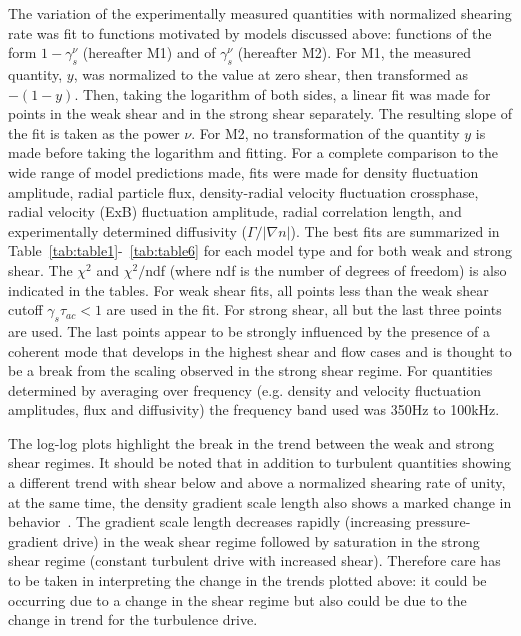 \documentclass[aip,pop,amsmath,amssymb,peprint,superscriptaddress]{revtex4-1} %
\begin{document}
The variation of the experimentally measured quantities with normalized shearing rate was fit to functions motivated by models discussed above: functions of the form $1-\gamma_{s}^{\nu}$ (hereafter M1) and of $\gamma_{s}^{\nu}$ (hereafter M2). For M1, the measured quantity, $y$, was normalized to the value at zero shear, then transformed as $-(1-y)$. Then, taking the logarithm of both sides, a linear fit was made for points in the weak shear and in the strong shear separately. The resulting slope of the fit is taken as the power $\nu$. For M2, no transformation of the quantity $y$ is made before taking the logarithm and fitting. For a complete comparison to the wide range of model predictions made, fits were made for density fluctuation amplitude, radial particle flux, density-radial velocity fluctuation crossphase, radial velocity (ExB) fluctuation amplitude, radial correlation length, and experimentally determined diffusivity ($\Gamma/|\nabla n|$). The best fits are summarized in Table~\ref{tab:table1}-~\ref{tab:table6} for each model type and for both weak and strong shear. The $\chi^{2}$ and $\chi^{2}/$ndf (where ndf is the number of degrees of freedom) is also indicated in the tables.  For weak shear fits, all points less than the weak shear cutoff $\gamma_{s}\tau_{ac}<1$ are used in the fit. For strong shear, all but the last three points are used. The last points appear to be strongly influenced by the presence of a coherent mode that develops in the highest shear and flow cases and is thought to be a break from the scaling observed in the strong shear regime. For quantities determined by averaging over frequency (e.g. density and velocity fluctuation amplitudes, flux and diffusivity) the frequency band used was 350Hz to 100kHz.

The log-log plots highlight the break in the trend between the weak and
strong shear regimes. It should be noted that in addition to turbulent
quantities showing a different trend with shear below and above a
normalized shearing rate of unity, at the same time, the density
gradient scale length also shows a marked change in
behavior~\cite{schaffner12}.  The gradient scale length decreases
rapidly (increasing pressure-gradient drive) in the weak shear
regime followed by saturation in the strong shear regime (constant
turbulent drive with increased shear). Therefore care has to be taken in interpreting the change in the trends plotted above: it could be occurring due to a change in the shear regime but also could be due to the change in trend for the turbulence drive.
\end{document}

